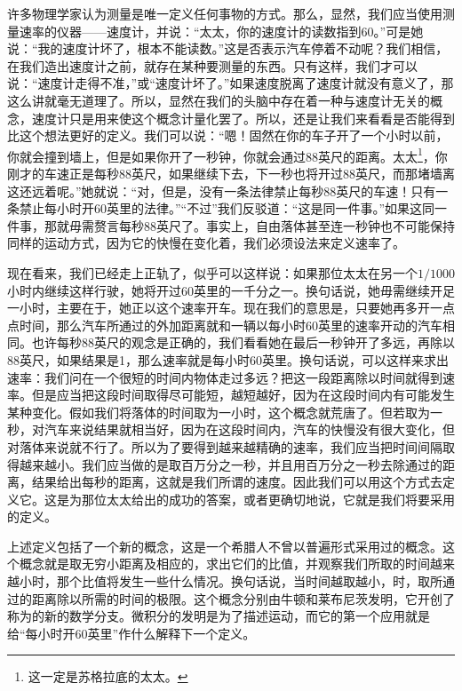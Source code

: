 许多物理学家认为测量是唯一定义任何事物的方式。那么，显然，我们应当使用测量速率的仪器——速度计，并说：“太太，你的速度计的读数指到60。”可是她说：“我的速度计坏了，根本不能读数。”这是否表示汽车停着不动呢？我们相信，在我们造出速度计之前，就存在某种要测量的东西。只有这样，我们才可以说：“速度计走得不准，”或“速度计坏了。”如果速度脱离了速度计就没有意义了，那这么讲就毫无道理了。所以，显然在我们的头脑中存在着一种与速度计无关的概念，速度计只是用来使这个概念计量化罢了。所以，还是让我们来看看是否能得到比这个想法更好的定义。我们可以说：“嗯！固然在你的车子开了一个小时以前，你就会撞到墙上，但是如果你开了一秒钟，你就会通过88英尺的距离。太太\footnote{这一定是苏格拉底的太太。}，你刚才的车速正是每秒88英尺，如果继续下去，下一秒也将开过88英尺，而那堵墙离这还远着呢。”她就说：“对，但是，没有一条法律禁止每秒88英尺的车速！只有一条禁止每小时开60英里的法律。”“不过”我们反驳道：“这是同一件事。”如果这同一件事，那就毋需赘言每秒88英尺了。事实上，自由落体甚至连一秒钟也不可能保持同样的运动方式，因为它的快慢在变化着，我们必须设法来定义速率了。

现在看来，我们已经走上正轨了，似乎可以这样说：如果那位太太在另一个$1/1000$小时内继续这样行驶，她将开过60英里的一千分之一。换句话说，她毋需继续开足一小时，主要在于，她正以这个速率开车。现在我们的意思是，只要她再多开一点点时间，那么汽车所通过的外加距离就和一辆以每小时60英里的速率开动的汽车相同。也许每秒88英尺的观念是正确的，我们看看她在最后一秒钟开了多远，再除以88英尺，如果结果是1，那么速率就是每小时60英里。换句话说，可以这样来求出速率：我们问在一个很短的时间内物体走过多远？把这一段距离除以时间就得到速率。但是应当把这段时间取得尽可能短，越短越好，因为在这段时间内有可能发生某种变化。假如我们将落体的时间取为一小时，这个概念就荒唐了。但若取为一秒，对汽车来说结果就相当好，因为在这段时间内，汽车的快慢没有很大变化，但对落体来说就不行了。所以为了要得到越来越精确的速率，我们应当把时间间隔取得越来越小。我们应当做的是取百万分之一秒，并且用百万分之一秒去除通过的距离，结果给出每秒的距离，这就是我们所谓的速度。因此我们可以用这个方式去定义它。这是为那位太太给出的成功的答案，或者更确切地说，它就是我们将要采用的定义。

上述定义包括了一个新的概念，这是一个希腊人不曾以普遍形式采用过的概念。这个概念就是取无穷小距离及相应的，求出它们的比值，并观察我们所取的时间越来越小时，那个比值将发生一些什么情况。换句话说，当时间越取越小，时，取所通过的距离除以所需的时间的极限。这个概念分别由牛顿和莱布尼茨发明，它开创了称为的新的数学分支。微积分的发明是为了描述运动，而它的第一个应用就是给“每小时开60英里”作什么解释下一个定义。

